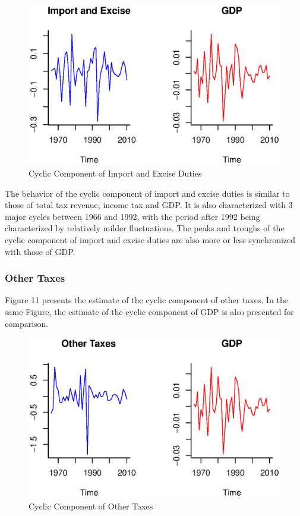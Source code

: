 \documentclass[12pt,a4paper,final]{article}
\begin{document}
\begin{figure}[ht]
\centering
\begin{small}
\caption{Cyclic Component of Import and Excise Duties}
\end{small}
\includegraphics[scale=0.601]{import_taxes.eps} 
\end{figure}

The behavior of the cyclic component of import and excise duties is similar to those of total tax revenue, income tax and GDP. It is also characterized with 3 major cycles between 1966 and 1992, with the period after 1992 being characterized by relatively milder fluctuations.  The peaks and troughs of the cyclic component of import and excise duties are also more or less synchronized with those of GDP.

\subsubsection{Other Taxes}

Figure 11 presents the estimate of the cyclic component of other taxes. In the same Figure, the estimate of the cyclic component of GDP is also presented for comparison.

\begin{figure}[ht]
\centering
\begin{small}
\caption{Cyclic Component of Other Taxes}
\end{small}
\includegraphics[scale=0.601]{other_taxes.eps} 
\end{figure}
\end{document}
